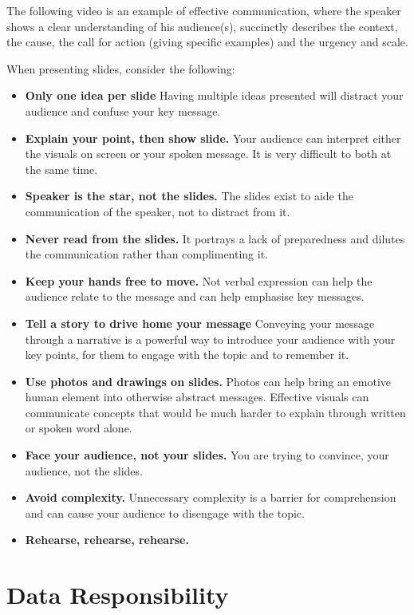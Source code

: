 \documentclass[
  a4paper,
  onecolumn,
  oneside]{book}
\begin{document}
The following video is an example of effective communication, where the
speaker shows a clear understanding of his audience(s), succinctly
describes the context, the cause, the call for action (giving specific
examples) and the urgency and scale.

When presenting slides, consider the following:

\begin{itemize}
\item
  \textbf{Only one idea per slide} Having multiple ideas presented will
  distract your audience and confuse your key message.
\item
  \textbf{Explain your point, then show slide.} Your audience can
  interpret either the visuals on screen or your spoken message. It is
  very difficult to both at the same time.
\item
  \textbf{Speaker is the star, not the slides.} The slides exist to aide
  the communication of the speaker, not to distract from it.
\item
  \textbf{Never read from the slides.} It portrays a lack of
  preparedness and dilutes the communication rather than complimenting
  it.
\item
  \textbf{Keep your hands free to move.} Not verbal expression can help
  the audience relate to the message and can help emphasise key
  messages.
\item
  \textbf{Tell a story to drive home your message} Conveying your
  message through a narrative is a powerful way to introduce your
  audience with your key points, for them to engage with the topic and
  to remember it.
\item
  \textbf{Use photos and drawings on slides.} Photos can help bring an
  emotive human element into otherwise abstract messages. Effective
  visuals can communicate concepts that would be much harder to explain
  through written or spoken word alone.
\item
  \textbf{Face your audience, not your slides.} You are trying to
  convince, your audience, not the slides.
\item
  \textbf{Avoid complexity.} Unnecessary complexity is a barrier for
  comprehension and can cause your audience to disengage with the topic.
\item
  \textbf{Rehearse, rehearse, rehearse.}
\end{itemize}

\hypertarget{data-responsibility}{%
\chapter{Data Responsibility}\label{data-responsibility}}
\end{document}

